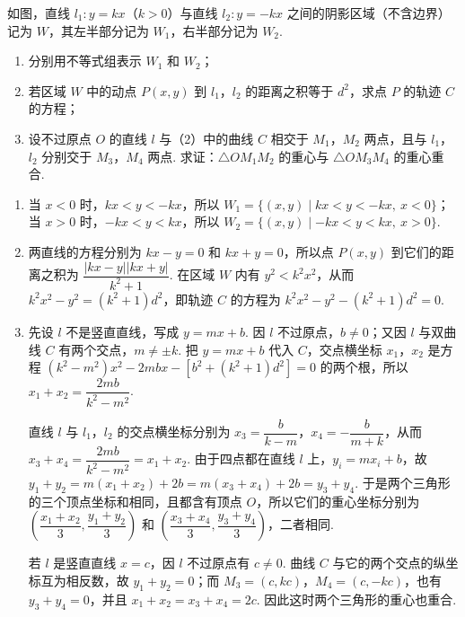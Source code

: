 \begin{problem}
如图，直线 \(l_1:y=kx\)（\(k>0\)）与直线 \(l_2:y=-kx\) 之间的阴影区域（不含边界）记为 \(W\)，其左半部分记为 \(W_1\)，右半部分记为 \(W_2\).

\begin{enumerate}
\item 分别用不等式组表示 \(W_1\) 和 \(W_2\)；
\item 若区域 \(W\) 中的动点 \(P(x,y)\) 到 \(l_1\)，\(l_2\) 的距离之积等于 \(d^2\)，求点 \(P\) 的轨迹 \(C\) 的方程；
\item 设不过原点 \(O\) 的直线 \(l\) 与（2）中的曲线 \(C\) 相交于 \(M_1\)，\(M_2\) 两点，且与 \(l_1\)，\(l_2\) 分别交于 \(M_3\)，\(M_4\) 两点. 求证：\(\triangle OM_1M_2\) 的重心与 \(\triangle OM_3M_4\) 的重心重合.
\end{enumerate}

\end{problem}

\begin{solution}
\begin{enumerate}
\item 当 \(x<0\) 时，\(kx<y<-kx\)，所以 \(W_1=\{(x,y)\mid kx<y<-kx,\ x<0\}\)；当 \(x>0\) 时，\(-kx<y<kx\)，所以 \(W_2=\{(x,y)\mid-kx<y<kx,\ x>0\}\).
\item 两直线的方程分别为 \(kx-y=0\) 和 \(kx+y=0\)，所以点 \(P(x,y)\) 到它们的距离之积为 \(\dfrac{|kx-y||kx+y|}{k^2+1}\). 在区域 \(W\) 内有 \(y^2<k^2x^2\)，从而 \(k^2x^2-y^2=(k^2+1)d^2\)，即轨迹 \(C\) 的方程为 \(k^2x^2-y^2-(k^2+1)d^2=0\).
\item 先设 \(l\) 不是竖直直线，写成 \(y=mx+b\). 因 \(l\) 不过原点，\(b\neq0\)；又因 \(l\) 与双曲线 \(C\) 有两个交点，\(m\neq\pm k\). 把 \(y=mx+b\) 代入 \(C\)，交点横坐标 \(x_1\)，\(x_2\) 是方程
\( (k^2-m^2)x^2-2mbx-\left[b^2+(k^2+1)d^2\right]=0 \)
的两个根，所以 \(x_1+x_2=\dfrac{2mb}{k^2-m^2}\).

直线 \(l\) 与 \(l_1\)，\(l_2\) 的交点横坐标分别为 \(x_3=\dfrac{b}{k-m}\)，\(x_4=-\dfrac{b}{m+k}\)，从而 \(x_3+x_4=\dfrac{2mb}{k^2-m^2}=x_1+x_2\). 由于四点都在直线 \(l\) 上，\(y_i=mx_i+b\)，故 \(y_1+y_2=m(x_1+x_2)+2b=m(x_3+x_4)+2b=y_3+y_4\). 于是两个三角形的三个顶点坐标和相同，且都含有顶点 \(O\)，所以它们的重心坐标分别为 \(\left(\dfrac{x_1+x_2}{3},\dfrac{y_1+y_2}{3}\right)\) 和 \(\left(\dfrac{x_3+x_4}{3},\dfrac{y_3+y_4}{3}\right)\)，二者相同.

若 \(l\) 是竖直直线 \(x=c\)，因 \(l\) 不过原点有 \(c\neq0\). 曲线 \(C\) 与它的两个交点的纵坐标互为相反数，故 \(y_1+y_2=0\)；而 \(M_3=(c,kc)\)，\(M_4=(c,-kc)\)，也有 \(y_3+y_4=0\)，并且 \(x_1+x_2=x_3+x_4=2c\). 因此这时两个三角形的重心也重合.
\end{enumerate}
\end{solution}
